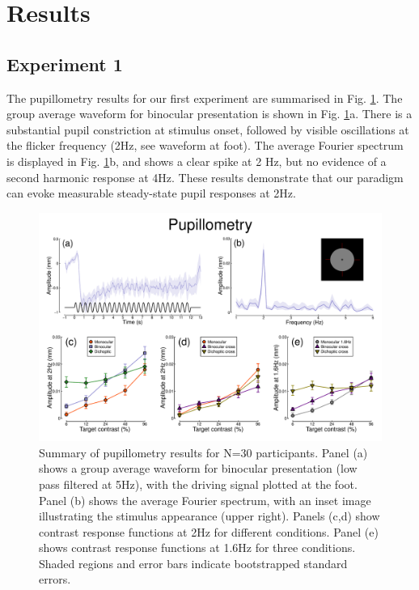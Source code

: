 \documentclass[
]{article}
\begin{document}
\hypertarget{results}{%
\section{Results}\label{results}}

\hypertarget{experiment-1}{%
\subsection{Experiment 1}\label{experiment-1}}

The pupillometry results for our first experiment are summarised in Fig. \ref{fig:pupildata}. The group average waveform for binocular presentation is shown in Fig. \ref{fig:pupildata}a. There is a substantial pupil constriction at stimulus onset, followed by visible oscillations at the flicker frequency (2Hz, see waveform at foot). The average Fourier spectrum is displayed in Fig. \ref{fig:pupildata}b, and shows a clear spike at 2 Hz, but no evidence of a second harmonic response at 4Hz. These results demonstrate that our paradigm can evoke measurable steady-state pupil responses at 2Hz.

\begin{figure}

{\centering \includegraphics{Figures/pupildata} 

}

\caption{Summary of pupillometry results for N=30 participants. Panel (a) shows a group average waveform for binocular presentation (low pass filtered at 5Hz), with the driving signal plotted at the foot. Panel (b) shows the average Fourier spectrum, with an inset image illustrating the stimulus appearance (upper right). Panels (c,d) show contrast response functions at 2Hz for different conditions. Panel (e) shows contrast response functions at 1.6Hz for three conditions. Shaded regions and error bars indicate bootstrapped standard errors.}\label{fig:pupildata}
\end{figure}
\end{document}

